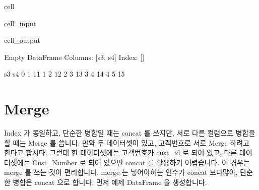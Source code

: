 \documentclass[letterpaper,10pt,english]{jupyterBook}
\begin{document}
\begin{sphinxuseclass}{cell}
\begin{sphinxVerbatimInput}
\begin{sphinxuseclass}{cell_input}
\end{sphinxuseclass}\end{sphinxVerbatimInput}
\begin{sphinxVerbatimOutput}

\begin{sphinxuseclass}{cell_output}
\begin{sphinxVerbatim}[commandchars=\\\{\}]
Empty DataFrame
Columns: [s3, s4]
Index: []


   s3  s4
0   1  11
1   2  12
2   3  13
3   4  14
4   5  15
\end{sphinxVerbatim}

\end{sphinxuseclass}\end{sphinxVerbatimOutput}

\end{sphinxuseclass}

\section{Merge}
\label{\detokenize{chapter2/2.2.2_Useful_Techniques:merge}}
\sphinxAtStartPar
Index 가 동일하고, 단순한 병합일 때는 concat 를 쓰지만, 서로 다른 컬럼으로 병합을 할 때는 Merge 를 씁니다.
만약 두 데이터셋이 있고, 고객번호로 서로 Merge 하려고 한다고 합시다. 그런데 한 데이터셋에는 고객번호가 cust\_id 로 되어 있고, 다른 데이터셋에는 Cust\_Number 로 되어 있으면 concat 를 활용하기 어렵습니다. 이 경우는 merge 를 쓰는 것이 편리합니다. merge 는 넣어야하는 인수가 concat 보다많아, 단순한 병합은 concat 으로 합니다. 먼저 예제 DataFrame 을 생성합니다.
\end{document}
